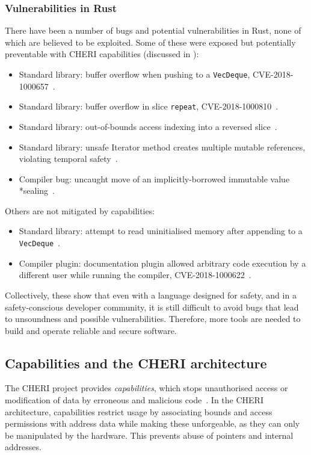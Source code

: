 \documentclass[dissertation.tex]{subfiles}
\begin{document}
\subsubsection{Vulnerabilities in Rust}
There have been a number of bugs and potential vulnerabilities in Rust,
none of which are believed to be exploited.
Some of these were exposed but potentially preventable with CHERI
capabilities (discussed in ):

\begin{itemize}
    \item Standard library: buffer overflow when pushing to a
    \texttt{VecDeque}, CVE-2018-1000657~\cite{cve-push,rust-issue-push}.
    \item Standard library: buffer overflow in slice \texttt{repeat},
    CVE-2018-1000810~\cite{cve-repeat,rust-advisory-repeat,rust-pr-slice}.
    \item Standard library: out-of-bounds access indexing into a
    reversed slice~\cite{rust-pr-reverse,rust-commit-reverse}.
    \item Standard library: unsafe Iterator method creates
    multiple mutable references, violating temporal
    safety~\cite{rust-issue-vec-mut}.
    \item Compiler bug: uncaught move of an implicitly-borrowed
    immutable value *sealing~\cite{rust-issue-match-borrow}.
\end{itemize}

Others are not mitigated by capabilities:

\begin{itemize}
    \item Standard library: attempt to read uninitialised memory after
    appending to a \texttt{VecDeque}~\cite{rust-issue-deque-append}.
    \item Compiler plugin: documentation plugin allowed arbitrary code
    execution by a different user while running the
    compiler, CVE-2018-1000622~\cite{cve-rustdoc,rust-advisory-rustdoc}.
\end{itemize}

Collectively, these show that even with a language designed for safety,
and in a safety-conscious developer community, it is still difficult to
avoid bugs that lead to unsoundness and possible vulnerabilities.
Therefore, more tools are needed to build and operate reliable and
secure software.


\subsection{Capabilities and the CHERI architecture}
The CHERI project provides \emph{capabilities}, which stops unauthorised access or modification of data by erroneous and malicious code~\cite{cheri-v6}.
In the CHERI architecture, capabilities restrict usage by associating bounds and access permissions with address data while making these unforgeable, as they can only be manipulated by the hardware.
This prevents abuse of pointers and internal addresses.
\end{document}
